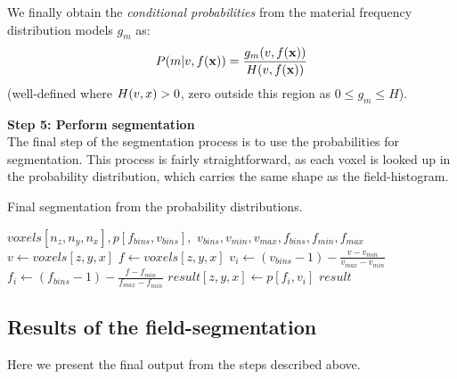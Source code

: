 \documentclass[pdflatex,sn-mathphys]{sn-jnl}%
\theoremstyle{thmstyleone}%
\theoremstyle{thmstyletwo}%
\theoremstyle{thmstylethree}%
\begin{document}
We finally obtain the {\it conditional probabilities} from the material frequency distribution
models $g_m$ as:
\begin{equation}
  \label{eq:Pm}
  P\!\left(m\middle\vert v,f(\mathbf{x})\right) = \frac{g_m(v,f(\mathbf{x}))}{H(v,f(\mathbf{x}))}
\end{equation}
(well-defined where $H(v,x) > 0$, zero outside this region as $0\le g_m \le H$).


\vspace{\baselineskip}
\noindent\textbf{Step 5: Perform segmentation} \\
The final step of the segmentation process is to use the probabilities for segmentation.
This process is fairly straightforward, as each voxel is looked up in the probability distribution,
which carries the same shape as the field-histogram.

\begin{algorithm}
    \caption{Final segmentation from the probability distributions.}
    \label{alg:segment}
    \begin{algorithmic}
         {$voxels[n_z,n_y,n_x], p[f_{bins},v_{bins}],$ \newline \indent \indent $v_{bins}, v_{min}, v_{max}, f_{bins}, f_{min}, f_{max}$}
                \State $v \gets voxels[z,y,x]$
                    \State $f \gets voxels[z,y,x]$
                        \State $v_i \gets (v_{bins} - 1) - \frac{v - v_{min}}{v_{max} - v_{min}}$
                        \State $f_i \gets (f_{bins} - 1) - \frac{f - f_{min}}{f_{max} - f_{min}}$
                        \State $result[z,y,x] \gets p[f_i, v_i]$
                    \EndIf
                \EndIf
            \EndFor
            \State \Return $result$
        \EndFunction
    \end{algorithmic}
\end{algorithm}

\subsection{Results of the field-segmentation}

Here we present the final output from the steps described above.
\end{document}
